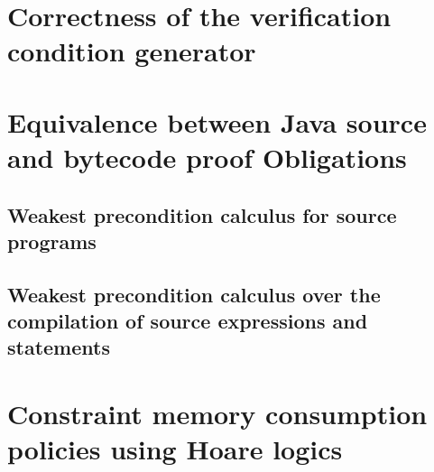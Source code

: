 \documentclass[book,10pt]{book}
\begin{document}
\chapter{Correctness of the verification condition generator}\label{proofGeneral}
  
  
  
  



\chapter{Equivalence between Java source and bytecode proof Obligations}\label{pogEquiv}
  
  
  
   
	 
  
%   
%   
   
  

  \section{Weakest precondition calculus for source programs}\label{pog:wpSrcGeneral}
     
    	  
    
    


  \section{Weakest precondition calculus over the compilation of source expressions and statements}\label{pog:wpBcGeneral}
    
    
     




 
\chapter{Constraint memory consumption policies using Hoare logics}\label{applications:memory}
  
  \lstset{numbers=none}
\end{document}
